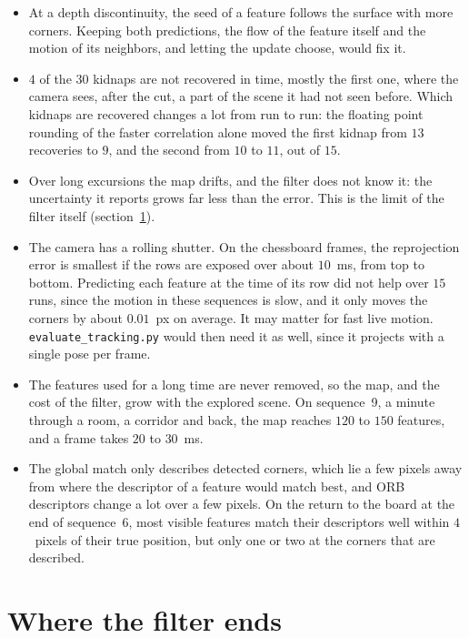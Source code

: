 \documentclass[11pt]{article}
\begin{document}
\begin{itemize}
  \item At a depth discontinuity, the seed of a feature follows the surface with more corners.
        Keeping both predictions, the flow of the feature itself and the motion of its neighbors,
        and letting the update choose, would fix it.
  \item $4$ of the $30$ kidnaps are not recovered in time, mostly the first one, where the camera
        sees, after the cut, a part of the scene it had not seen before. Which kidnaps are recovered
        changes a lot from run to run: the floating point rounding of the faster correlation alone
        moved the first kidnap from $13$ recoveries to $9$, and the second from $10$ to $11$, out
        of $15$.
  \item Over long excursions the map drifts, and the filter does not know it: the uncertainty it
        reports grows far less than the error. This is the limit of the filter itself
        (section~\ref{sec:limit}).
  \item The camera has a rolling shutter. On the chessboard frames, the reprojection error is
        smallest if the rows are exposed over about $10$~ms, from top to bottom. Predicting each
        feature at the time of its row did not help over $15$ runs, since the motion in these
        sequences is slow, and it only moves the corners by about $0.01$~px on average. It may
        matter for fast live motion. \texttt{evaluate\_tracking.py} would then need it as well,
        since it projects with a single pose per frame.
  \item The features used for a long time are never removed, so the map, and the cost of the
        filter, grow with the explored scene. On sequence~9, a minute through a room, a corridor
        and back, the map reaches $120$ to $150$ features, and a frame takes $20$ to $30$~ms.
  \item The global match only describes detected corners, which lie a few pixels away from where
        the descriptor of a feature would match best, and ORB descriptors change a lot over a few
        pixels. On the return to the board at the end of sequence~6, most visible features match
        their descriptors well within $4$~pixels of their true position, but only one or two at the
        corners that are described.
\end{itemize}

\section{Where the filter ends}
\label{sec:limit}
\end{document}
